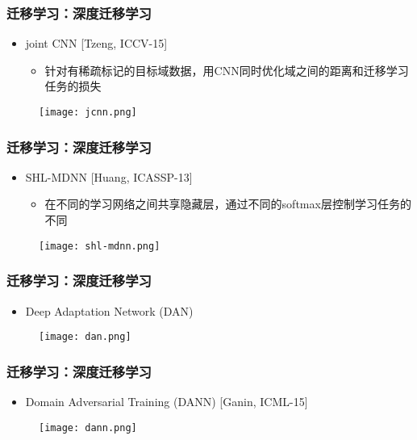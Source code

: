 \begin{frame}
    \frametitle{迁移学习：深度迁移学习}
    \begin{itemize}
        \item joint CNN [Tzeng, ICCV-15]
            \begin{itemize}
                \item 针对有稀疏标记的目标域数据，用CNN同时优化域之间的距离和迁移学习任务的损失
            \end{itemize}
    \end{itemize}
    \begin{figure}
        \texttt{[image: jcnn.png]}
    \end{figure}
\end{frame}

\begin{frame}
    \frametitle{迁移学习：深度迁移学习}
    \begin{itemize}
        \item SHL-MDNN [Huang, ICASSP-13]
            \begin{itemize}
                \item 在不同的学习网络之间共享隐藏层，通过不同的softmax层控制学习任务的不同
            \end{itemize}
    \end{itemize}
    \begin{figure}
        \texttt{[image: shl-mdnn.png]}
    \end{figure}
\end{frame}

\begin{frame}
    \frametitle{迁移学习：深度迁移学习}
    \begin{itemize}
        \item Deep Adaptation Network (DAN)
    \end{itemize}
    \begin{figure}
        \texttt{[image: dan.png]}
    \end{figure}
\end{frame}

\begin{frame}
    \frametitle{迁移学习：深度迁移学习}
    \begin{itemize}
        \item Domain Adversarial Training (DANN) [Ganin, ICML-15]
    \end{itemize}
    \begin{figure}
        \texttt{[image: dann.png]}
    \end{figure}
\end{frame}

